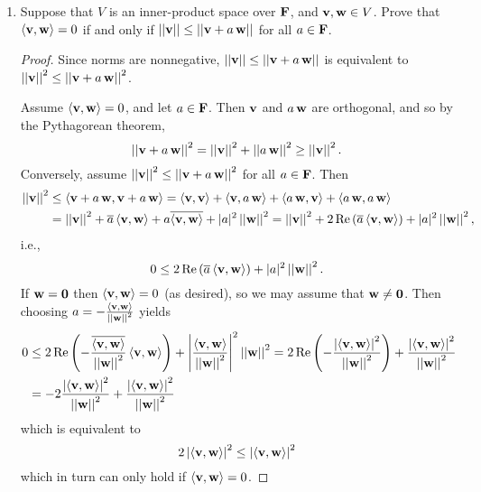 \documentclass[11pt]{amsart}
\begin{document}
\begin{enumerate}[(1)]
\begin{proof}
\begin{enumerate}
\item Combining the first two equations in (a) with
\begin{align*}
  \norm{ \v + i \, \w }^2 &= \inner{ \v + i \, \w }{ \v + i \, \w } = \inner \v \v - i \inner \v \w + i \inner \w \v + \inner \w \w \\
  \norm{ \v - i \, \w }^2 &= \inner{ \v - i \, \w }{ \v - i \, \w } = \inner \v \v + i \inner \v \w - i \inner \w \v + \inner \w \w
\end{align*}
yields
\[
  \norm{ \v + \w }^2 - \norm{ \v - \w }^2 + i \norm{ \v + i \, \w }^2 - i \norm{ \v - i \, \w }^2
  = 4 \inner \v \w \, . \qedhere
\]

\end{enumerate}
\end{proof}

\item Suppose that $V$ is an inner-product space over $\F$, and $\v, \w \in V$.
Prove that $\inner \v \w = 0$ if and only if $\norm \v \le \norm{\v + a \, \w}$ for all $a \in \F$.

\begin{proof}
Since norms are nonnegative, $\norm \v \le \norm{\v + a \, \w}$ is equivalent to $\norm \v^2 \le \norm{\v + a \, \w}^2$.

Assume $\inner \v \w = 0$, and let $a \in \F$.
Then $\v$ and $a\, \w$ are orthogonal, and so by the Pythagorean theorem,
\[
  \norm{ \v + a \, \w }^2 = \norm \v^2 + \norm{ a \, \w }^2 \ge \norm \v^2 .
\]
Conversely, assume $\norm \v^2 \le \norm{\v + a \, \w}^2$ for all $a \in \F$.
Then
\begin{align*}
  \norm \v^2
  &\le \inner{ \v + a \, \w }{ \v + a \, \w }
  = \inner \v \v + \inner \v {a \, \w} + \inner {a \, \w} \v + \inner{a \, \w}{a \, \w} \\
  &= \norm \v^2 + \overline a \inner \v \w + a \overline{ \inner \v \w } + |a|^2 \norm \w^2
  = \norm \v^2 + 2 \Re \left( \overline a \inner \v \w \right) + |a|^2 \norm \w^2 ,
\end{align*}
i.e.,
\[
  0 \le 2 \Re \left( \overline a \inner \v \w \right) + |a|^2 \norm \w^2 .
\]
If $\w = \0$ then $\inner \v \w = 0$ (as desired), so we may assume that $\w \ne \0$.
Then choosing $a = - \frac{ \inner \v \w }{ \norm \w^2 }$ yields
\begin{align*}
  0
  &\le 2 \Re \left( - \frac{ \overline{ \inner \v \w } }{ \norm \w^2 } \inner \v \w \right) + \left| \frac{ \inner \v \w }{ \norm \w^2 } \right|^2 \norm \w^2
  = 2 \Re \left( - \frac{ \left| \inner \v \w  \right|^2 }{ \norm \w^2 } \right) + \frac{ \left| \inner \v \w  \right|^2 }{ \norm \w^2 } \\
  &= -2 \frac{ \left| \inner \v \w  \right|^2 }{ \norm \w^2 } + \frac{ \left| \inner \v \w  \right|^2 }{ \norm \w^2 }
\end{align*}
which is equivalent to
\[
  2 \left| \inner \v \w  \right|^2 \le \left| \inner \v \w  \right|^2
\]
which in turn can only hold if $\inner \v \w = 0$.
\end{proof}


\end{enumerate}
\end{document}
